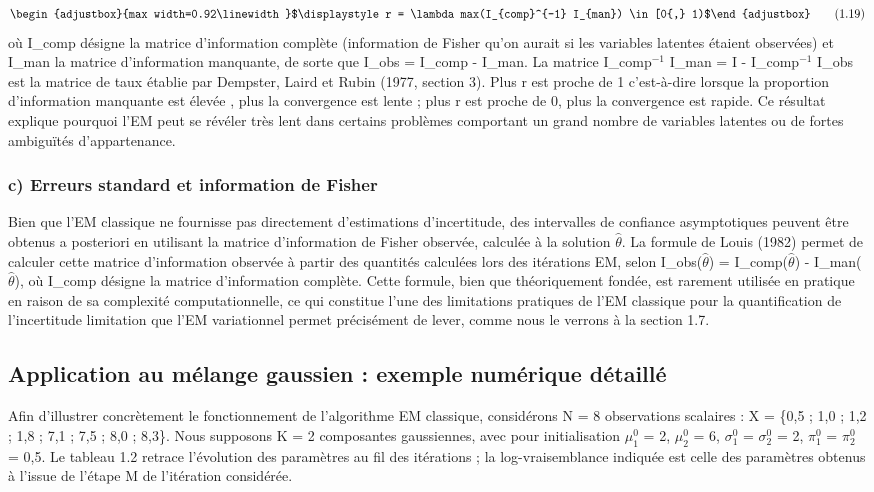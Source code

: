 \begin{equation}
\begin{adjustbox}{max width=0.92\linewidth}$\displaystyle r = \lambda max(I_{comp}^{-1} I_{man}) \in  [0{,} 1)$\end{adjustbox}
\tag{1.19}
\label{eq:1_19}
\end{equation}
où I\_comp désigne la matrice d'information complète (information de Fisher qu'on aurait si les variables latentes étaient observées) et I\_man la matrice d'information manquante, de sorte que I\_obs = I\_comp - I\_man. La matrice I\_comp$^{-1}$ I\_man = I - I\_comp$^{-1}$ I\_obs est la matrice de taux établie par Dempster, Laird et Rubin (1977, section 3). Plus r est proche de 1  c'est-à-dire lorsque la proportion d'information manquante est élevée , plus la convergence est lente ; plus r est proche de 0, plus la convergence est rapide. Ce résultat explique pourquoi l'EM peut se révéler très lent dans certains problèmes comportant un grand nombre de variables latentes ou de fortes ambiguïtés d'appartenance.

\subsubsection{c) Erreurs standard et information de Fisher}
Bien que l'EM classique ne fournisse pas directement d'estimations d'incertitude, des intervalles de confiance asymptotiques peuvent être obtenus a posteriori en utilisant la matrice d'information de Fisher observée, calculée à la solution $\hat{\theta }$. La formule de Louis (1982) permet de calculer cette matrice d'information observée à partir des quantités calculées lors des itérations EM, selon I\_obs($\hat{\theta }$) = I\_comp($\hat{\theta }$) - I\_man($\hat{\theta }$), où I\_comp désigne la matrice d'information complète. Cette formule, bien que théoriquement fondée, est rarement utilisée en pratique en raison de sa complexité computationnelle, ce qui constitue l'une des limitations pratiques de l'EM classique pour la quantification de l'incertitude  limitation que l'EM variationnel permet précisément de lever, comme nous le verrons à la section 1.7.

\subsection{Application au mélange gaussien : exemple numérique détaillé}
Afin d'illustrer concrètement le fonctionnement de l'algorithme EM classique, considérons N = 8 observations scalaires : X = \{0,5 ; 1,0 ; 1,2 ; 1,8 ; 7,1 ; 7,5 ; 8,0 ; 8,3\}. Nous supposons K = 2 composantes gaussiennes, avec pour initialisation $\mu _{1}^{0}$ = 2, $\mu _{2}^{0}$ = 6, $\sigma _{1}^{0}$ = $\sigma _{2}^{0}$ = 2, $\pi _{1}^{0}$ = $\pi _{2}^{0}$ = 0,5. Le tableau 1.2 retrace l'évolution des paramètres au fil des itérations ; la log-vraisemblance indiquée est celle des paramètres obtenus à l'issue de l'étape M de l'itération considérée.

